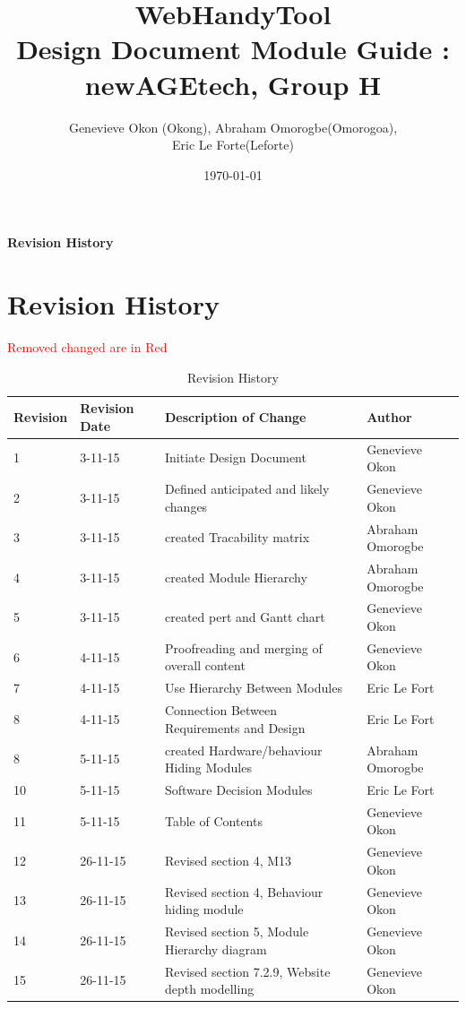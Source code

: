 \documentclass[titlepage]{article}
\begin{document}
\title{WebHandyTool \\
 Design Document Module Guide : newAGEtech, Group H }
\author{Genevieve Okon (Okong), Abraham Omorogbe(Omorogoa),\\
 Eric Le Forte(Leforte)}
\date{\today}
\maketitle


\tableofcontents
\listoffigures
\listoftables

\textbf{Revision History} \\ \normalsize
\pagebreak

\section{Revision History}
\textcolor{red}{Removed changed are in Red}
\begin{table}[h!]
	\begin{tabular}{| p{5cm} | p{5cm} | p{5cm} |p{5cm} |}    \hline
Revision  &Revision Date &Description of Change &Author\\ \hline
1& 3-11-15& Initiate Design Document&Genevieve Okon\\ \hline
2& 3-11-15& Defined anticipated and likely changes&Genevieve Okon\\ \hline
3& 3-11-15& created Tracability matrix &Abraham Omorogbe\\ \hline
4& 3-11-15& created  Module Hierarchy&Abraham Omorogbe\\ \hline
5& 3-11-15&created pert and Gantt chart&Genevieve Okon\\ \hline
6& 4-11-15& Proofreading and merging of overall content&Genevieve Okon\\ \hline
7& 4-11-15& Use Hierarchy Between Modules&Eric Le Fort\\ \hline
8& 4-11-15&Connection Between Requirements and Design&Eric Le Fort\\ \hline
8& 5-11-15& created Hardware/behaviour Hiding Modules&Abraham Omorogbe\\ \hline
10& 5-11-15& Software Decision Modules&Eric Le Fort\\ \hline
11& 5-11-15& Table of Contents&Genevieve Okon\\ \hline


12& 26-11-15&Revised section 4, M13&Genevieve Okon\\ \hline
13& 26-11-15&Revised section 4, Behaviour hiding module&Genevieve Okon\\ \hline
14& 26-11-15&Revised section 5, Module Hierarchy diagram&Genevieve Okon\\ \hline
15& 26-11-15&Revised section 7.2.9, Website depth modelling&Genevieve Okon\\ \hline
       \end{tabular}
       
       \caption{Revision History}
       \label{table:Revision History}
\end{table}
\end{document}

